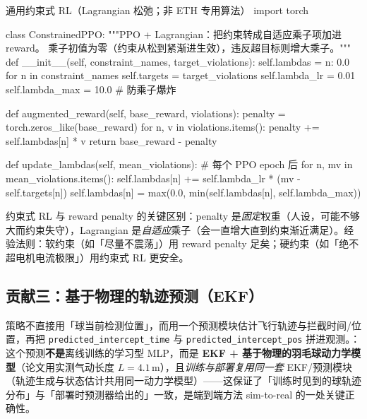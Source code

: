 \begin{codebox}[Python]{通用约束式 RL（Lagrangian 松弛；非 ETH 专用算法）}
import torch

class ConstrainedPPO:
    """PPO + Lagrangian：把约束转成自适应乘子项加进 reward。
    乘子初值为零（约束从松到紧渐进生效），违反超目标则增大乘子。"""
    def __init__(self, constraint_names, target_violations):
        self.lambdas = {n: 0.0 for n in constraint_names}
        self.targets = target_violations
        self.lambda_lr = 0.01
        self.lambda_max = 10.0                      # 防乘子爆炸

    def augmented_reward(self, base_reward, violations):
        penalty = torch.zeros_like(base_reward)
        for n, v in violations.items():
            penalty += self.lambdas[n] * v
        return base_reward - penalty

    def update_lambdas(self, mean_violations):       # 每个 PPO epoch 后
        for n, mv in mean_violations.items():
            self.lambdas[n] += self.lambda_lr * (mv - self.targets[n])
            self.lambdas[n] = max(0.0, min(self.lambdas[n], self.lambda_max))
\end{codebox}

约束式 RL 与 reward penalty 的关键区别：penalty 是\emph{固定}权重（人设，可能不够大而约束失守），Lagrangian 是\emph{自适应}乘子（会一直增大直到约束渐近满足）。经验法则：软约束（如「尽量不震荡」）用 reward penalty 足矣；硬约束（如「绝不超电机电流极限」）用约束式 RL 更安全。

\subsection{贡献三：基于物理的轨迹预测（EKF）}
\label{sec:rlmc-lm-eth-pred}

策略不直接用「球当前检测位置」，而用一个预测模块估计飞行轨迹与拦截时间/位置，再把 \verb|predicted_intercept_time| 与 \verb|predicted_intercept_pos| 拼进观测。：这个预测\textbf{不是}离线训练的学习型 MLP，而是 \textbf{EKF + 基于物理的羽毛球动力学模型}（论文用实测气动长度 $L=4.1\,$m），且\emph{训练与部署复用同一套} EKF/预测模块（轨迹生成与状态估计共用同一动力学模型）——这保证了「训练时见到的球轨迹分布」与「部署时预测器给出的」一致，是端到端方法 sim-to-real 的一处关键正确性。

